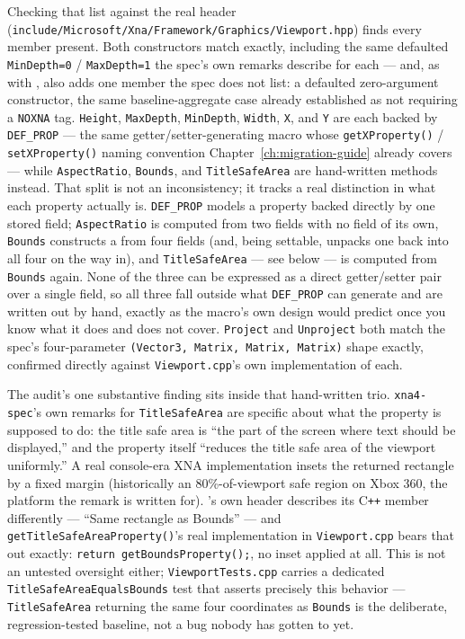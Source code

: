 Checking that list against the real header
(\texttt{include/\allowbreak{}Microsoft/\allowbreak{}Xna/\allowbreak{}Framework/\allowbreak{}Graphics/\allowbreak{}Viewport.hpp})
finds every member present. Both constructors match exactly, including the same defaulted
\texttt{MinDepth=0} / \texttt{MaxDepth=1} the spec's own remarks describe for each --- and, as
with ,  also adds one member the spec does not list: a
defaulted zero-argument constructor, the same baseline-aggregate case already established as
not requiring a \texttt{NOXNA} tag. \texttt{Height}, \texttt{MaxDepth}, \texttt{MinDepth},
\texttt{Width}, \texttt{X}, and \texttt{Y} are each backed by \texttt{DEF\_PROP} --- the same
getter/setter-generating macro whose \texttt{getXProperty()} / \texttt{setXProperty()} naming
convention Chapter~\ref{ch:migration-guide} already covers --- while \texttt{AspectRatio},
\texttt{Bounds}, and \texttt{TitleSafeArea} are hand-written methods instead. That split is not
an inconsistency; it tracks a real distinction in what each property actually is.
\texttt{DEF\_PROP} models a property backed directly by one stored field; \texttt{AspectRatio}
is computed from two fields with no field of its own, \texttt{Bounds} constructs a
 from four fields (and, being settable, unpacks one back into all four on
the way in), and \texttt{TitleSafeArea} --- see below --- is computed from \texttt{Bounds}
again. None of the three can be expressed as a direct getter/setter pair over a single field,
so all three fall outside what \texttt{DEF\_PROP} can generate and are written out by hand,
exactly as the macro's own design would predict once you know what it does and does not cover.
\texttt{Project} and \texttt{Unproject} both match the spec's four-parameter
\texttt{(Vector3, Matrix, Matrix, Matrix)} shape exactly, confirmed directly against
\texttt{Viewport.cpp}'s own implementation of each.

The audit's one substantive finding sits inside that hand-written trio. \texttt{xna4-spec}'s
own remarks for \texttt{TitleSafeArea} are specific about what the property is supposed to do:
the title safe area is ``the part of the screen where text should be displayed,'' and the
property itself ``reduces the title safe area of the viewport uniformly.'' A real console-era
XNA implementation insets the returned rectangle by a fixed margin (historically an
80\%-of-viewport safe region on Xbox 360, the platform the remark is written for).
's own header describes its C\texttt{++} member differently --- ``Same
rectangle as Bounds'' --- and \texttt{getTitleSafeAreaProperty()}'s real implementation in
\texttt{Viewport.cpp} bears that out exactly: \texttt{return getBoundsProperty();}, no inset
applied at all. This is not an untested oversight either; \texttt{ViewportTests.cpp} carries a
dedicated \texttt{TitleSafeAreaEqualsBounds} test that asserts precisely this behavior ---
\texttt{TitleSafeArea} returning the same four coordinates as \texttt{Bounds} is the
deliberate, regression-tested baseline, not a bug nobody has gotten to yet.

